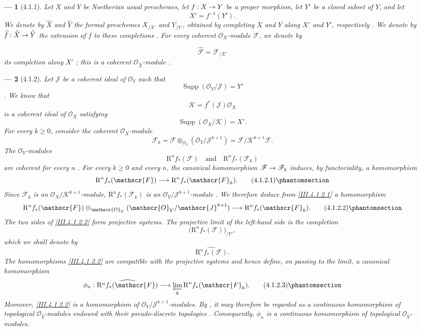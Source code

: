 \documentclass[oneside]{amsart}
\theoremstyle{ega-env-style}
\newtheorem*{env}{---}
\theoremstyle{ega-thm-env-style}
\theoremstyle{ega-defn-env-style}
\def\mathcal{\mathscr}
\def\sh{\mathcal}                   %
\def\geq{\geqslant}                 %
\def\vphi{\phi}                     %
\def\RR{\mathrm{R}}                 %
\def\Supp{\operatorname{Supp}}
\renewcommand{\to}{\mathchoice{\longrightarrow}{\rightarrow}{\rightarrow}{\rightarrow}}
\newcommand{\oldpage}[2][]{{\marginnote{\normalfont{\textbf{#1}~|~#2}}}\ignorespaces}
\let\EGAOriginalLabel\label
\renewcommand{\label}[1]{\phantomsection\EGAOriginalLabel{#1}}
\begin{document}
\begin{env}[4.1.1]
\label{III.4.1.1}
Let $X$ and $Y$ be Noetherian usual preschemes, let $f:X\to Y$ be a
proper morphism, let $Y'$ be a closed subset of $Y$, and let
\[
  X'=f^{-1}(Y').
\]
We denote by $\widehat{X}$ and $\widehat{Y}$ the formal preschemes
$X_{/X'}$ and $Y_{/Y'}$, obtained by completing $X$ and $Y$ along
$X'$ and $Y'$, respectively .
We denote by $\widehat{f}:\widehat{X}\to\widehat{Y}$ the extension of
$f$ to these completions .
For every coherent $\sh{O}_X$-module $\sh{F}$, we denote by

\oldpage[III]{123}

\[
  \widehat{\sh{F}}=\sh{F}_{/X'}
\]
its completion along $X'$ ; this is a coherent
$\sh{O}_{\widehat{X}}$-module .
\end{env}

\begin{env}[4.1.2]
\label{III.4.1.2}
Let $\sh{J}$ be a coherent ideal of $\sh{O}_Y$ such that
\[
  \Supp(\sh{O}_Y/\sh{J})=Y'
\]
.
We know  that
\[
  \sh{K}=f^*(\sh{J})\sh{O}_X
\]
is a coherent ideal of $\sh{O}_X$ satisfying
\[
  \Supp(\sh{O}_X/\sh{K})=X'.
\]
For every $k\geq0$, consider the coherent $\sh{O}_X$-module
\[
  \sh{F}_k
  =
  \sh{F}\otimes_{\sh{O}_Y}(\sh{O}_Y/\sh{J}^{k+1})
  =
  \sh{F}/\sh{K}^{k+1}\sh{F}.
\]
The $\sh{O}_Y$-modules
\[
  \RR^n f_*(\sh{F})
  \quad\text{and}\quad
  \RR^n f_*(\sh{F}_k)
\]
are coherent for every $n$ .
For every $k\geq0$ and every $n$, the canonical homomorphism
$\sh{F}\to\sh{F}_k$ induces, by functoriality, a homomorphism
\[
  \RR^n f_*(\sh{F})
  \longrightarrow
  \RR^n f_*(\sh{F}_k).
  \tag{4.1.2.1}
  \label{III.4.1.2.1}
\]
Since $\sh{F}_k$ is an $\sh{O}_X/\sh{K}^{k+1}$-module,
$\RR^n f_*(\sh{F}_k)$ is an
$\sh{O}_Y/\sh{J}^{k+1}$-module .
We therefore deduce from \eqref{III.4.1.2.1} a homomorphism
\[
  \RR^n f_*(\sh{F})
  \otimes_{\sh{O}_Y}(\sh{O}_Y/\sh{J}^{k+1})
  \longrightarrow
  \RR^n f_*(\sh{F}_k).
  \tag{4.1.2.2}
  \label{III.4.1.2.2}
\]
The two sides of \eqref{III.4.1.2.2} form projective systems.
The projective limit of the left-hand side is the completion
\[
  \bigl(\RR^n f_*(\sh{F})\bigr)_{/Y'},
\]
which we shall denote by
\[
  \widehat{\RR^n f_*(\sh{F})}.
\]
The homomorphisms \eqref{III.4.1.2.2} are compatible with the projective
systems and hence define, on passing to the limit, a canonical
homomorphism
\[
  \vphi_n:
  \widehat{\RR^n f_*(\sh{F})}
  \longrightarrow
  \varprojlim_k\RR^n f_*(\sh{F}_k).
  \tag{4.1.2.3}
  \label{III.4.1.2.3}
\]
Moreover, \eqref{III.4.1.2.2} is a homomorphism of
$\sh{O}_Y/\sh{J}^{k+1}$-modules.
By , it may therefore be regarded as a continuous
homomorphism of topological $\sh{O}_{\widehat{Y}}$-modules endowed with
their pseudo-discrete topologies .
Consequently, $\vphi_n$ is a continuous homomorphism of topological
$\sh{O}_{\widehat{Y}}$-modules.
\end{env}
\end{document}
